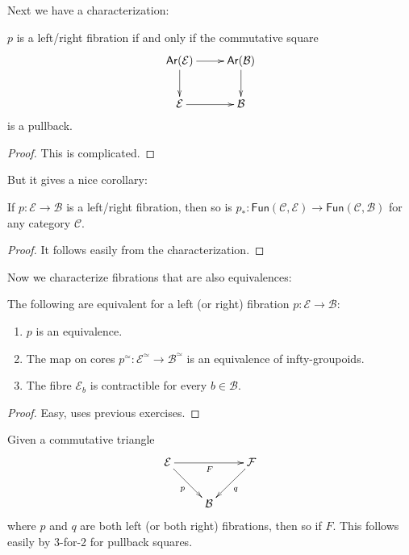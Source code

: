 \noindent
Next we have a characterization:

\begin{proposition}
\label{proposition-fibra-chara}
$p$ is a left/right fibration if and only if
the commutative square
$$
\xymatrix{
\mathsf{Ar}(\mathcal{E})\ar[r]\ar[d]&
\mathsf{Ar}(\mathcal{B})\ar[d]\\
\mathcal{E}\ar[r]&\mathcal{B}
}
$$
is a pullback.
\end{proposition}

\begin{proof}
This is complicated.
\end{proof}

\noindent
But it gives a nice corollary:

\begin{corollary}
\label{lemma-induced-map-fibration}
If $p:\mathcal{E}\to\mathcal{B}$ is a
left/right fibration,
then so is $p_*:
\mathsf{Fun}(\mathcal{C},\mathcal{E})
\to\mathsf{Fun}(\mathcal{C},\mathcal{B})$
for any category $\mathcal{C}$.
\end{corollary}

\begin{proof}
It follows easily from the characterization.
\end{proof}

\noindent
Now we characterize fibrations that are also
equivalences:

\begin{proposition}
\label{proposition-fibration-equivalence}
The following are equivalent for a left (or
right)
fibration $p:\mathcal{E} \to \mathcal{B}$:

\begin{enumerate}
\item $p$ is an equivalence.
\item The map on cores
$p^\simeq:\mathcal{E}^\simeq\to\mathcal{B}
^\simeq$
is an equivalence of infty-groupoids.
\item The fibre $\mathcal{E}_b$ is
contractible for every $b \in \mathcal{B}$.
\end{enumerate}
\end{proposition}

\begin{proof}
Easy, uses previous exercises.
\end{proof}

\begin{remark}[3-for-2]
\label{remark-3-for-2}
Given a commutative triangle
$$
\xymatrix{
\mathcal{E} \ar[rd]_{p} \ar[rr]_{F} &&
\mathcal{F} \ar[dl]^{q} \\
& \mathcal{B}
}
$$
where $p$ and $q$ are both left (or both
right)
fibrations, then so if $F$.
This follows easily by 3-for-2 for pullback
squares.
\end{remark}

